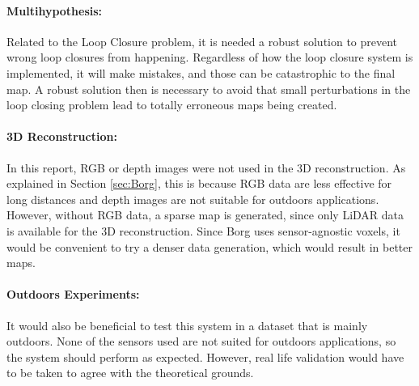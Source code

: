 \documentclass[12pt]{article}
\begin{document}
	\paragraph{Multihypothesis: } Related to the Loop Closure problem, it is needed a robust solution to prevent wrong loop closures from happening. Regardless of how the loop closure system is implemented, it will make mistakes, and those can be catastrophic to the final map. A robust solution then is necessary to avoid that small perturbations in the loop closing problem lead to totally erroneous maps being created.
	
	\paragraph{3D Reconstruction: } In this report, RGB or depth images were not used in the 3D reconstruction. As explained in Section \ref{sec:Borg}, this is because RGB data are less effective for long distances and depth images are not suitable for outdoors applications. However, without RGB data, a sparse map is generated, since only LiDAR data is available for the 3D reconstruction. Since Borg uses sensor-agnostic voxels, it would be convenient to try a denser data generation, which would result in better maps.
	
	\paragraph{Outdoors Experiments: } It would also be beneficial to test this system in a dataset that is mainly outdoors. None of the sensors used are not suited for outdoors applications, so the system should perform as expected. However, real life validation would have to be taken to agree with the theoretical grounds.
	
	
	\newpage
	
	
\end{document}
